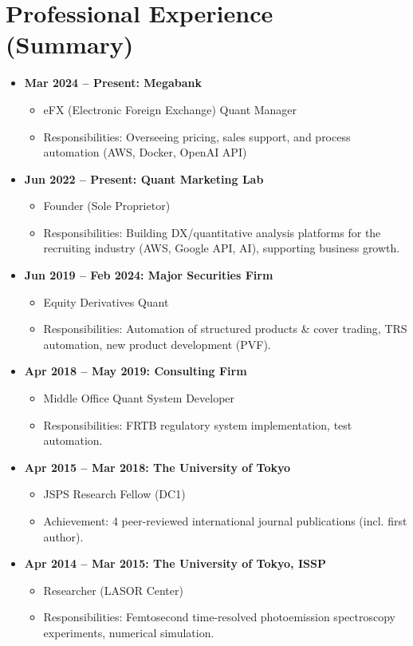 \documentclass[uplatex,a4j,10.5pt,dvipdfmx]{jsarticle}
\begin{document}
\section*{Professional Experience (Summary)}
\begin{itemize}[leftmargin=*]
	\item \textbf{Mar 2024 -- Present: Megabank}
	      \begin{itemize}
		      \item eFX (Electronic Foreign Exchange) Quant Manager
		      \item Responsibilities: Overseeing pricing, sales support, and process automation (AWS, Docker, OpenAI API)
	      \end{itemize}
	\item \textbf{Jun 2022 -- Present: Quant Marketing Lab}
	      \begin{itemize}
		      \item Founder (Sole Proprietor)
		      \item Responsibilities: Building DX/quantitative analysis platforms for the recruiting industry (AWS, Google API, AI), supporting business growth.
	      \end{itemize}
	\item \textbf{Jun 2019 -- Feb 2024: Major Securities Firm}
	      \begin{itemize}
		      \item Equity Derivatives Quant
		      \item Responsibilities: Automation of structured products \& cover trading, TRS automation, new product development (PVF).
	      \end{itemize}
	\item \textbf{Apr 2018 -- May 2019: Consulting Firm}
	      \begin{itemize}
		      \item Middle Office Quant System Developer
		      \item Responsibilities: FRTB regulatory system implementation, test automation.
	      \end{itemize}
	\item \textbf{Apr 2015 -- Mar 2018: The University of Tokyo}
	      \begin{itemize}
		      \item JSPS Research Fellow (DC1)
		      \item Achievement: 4 peer-reviewed international journal publications (incl. first author).
	      \end{itemize}
	\item \textbf{Apr 2014 -- Mar 2015: The University of Tokyo, ISSP}
	      \begin{itemize}
		      \item Researcher (LASOR Center)
		      \item Responsibilities: Femtosecond time-resolved photoemission spectroscopy experiments, numerical simulation.
	      \end{itemize}
\end{itemize}
\end{document}

